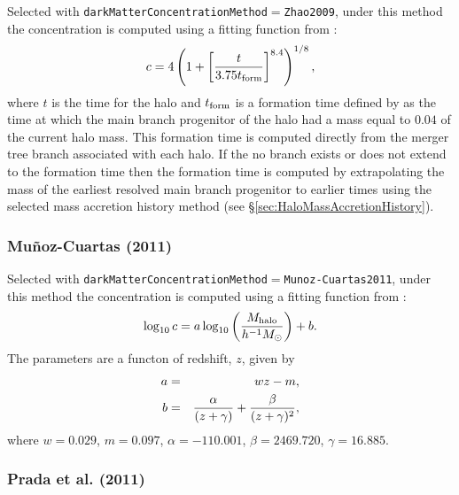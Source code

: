 Selected with {\tt darkMatterConcentrationMethod}$=${\tt Zhao2009}, under this method the concentration is computed using a fitting function from \cite{zhao_accurate_2009}:
\begin{equation}
 c = 4 \left(1 + \left[ {t  \over 3.75 t_{\rm form}}\right]^{8.4}\right)^{1/8},
\end{equation}
where $t$ is the time for the halo and $t_{\rm form}$ is a formation time defined by \cite{zhao_accurate_2009} as the time at which the main branch progenitor of the halo had a mass equal to $0.04$ of the current halo mass. This formation time is computed directly from the merger tree branch associated with each halo. If the no branch exists or does not extend to the formation time then the formation time is computed by extrapolating the mass of the earliest resolved main branch progenitor to earlier times using the selected mass accretion history method (see \S\ref{sec:HaloMassAccretionHistory}).

\subsubsection{Mu\~noz-Cuartas (2011)}

Selected with {\tt darkMatterConcentrationMethod}$=${\tt Munoz-Cuartas2011}, under this method the concentration is computed using a fitting function from \cite{munoz-cuartas_redshift_2011}:
\begin{equation}
\log_{10} c = a \log_{10} \left( {M_{\rm halo} \over h^{-1}M_\odot} \right) + b.
\end{equation}
The parameters are a functon of redshift, $z$, given by
\begin{eqnarray}
a &=& wz-m, \\
b &=& {\alpha \over (z+\gamma)} + {\beta \over (z+\gamma)^2},
\end{eqnarray}
where $w=0.029$, $m=0.097$, $\alpha=-110.001$, $\beta=2469.720$, $\gamma=16.885$.

\subsubsection{Prada et al. (2011)}

